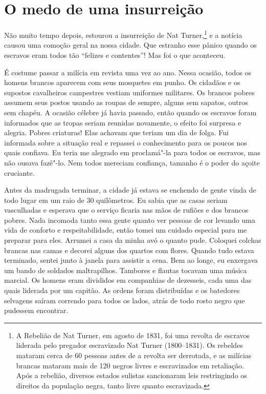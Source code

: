 \chapter*{O medo de uma insurreição}

Não muito tempo depois, estourou a
insurreição de Nat Turner,\footnote{A Rebelião de Nat Turner, em agosto
  de 1831, foi uma revolta de escravos liderada pelo pregador
  escravizado Nat Turner (1800--1831). Os rebeldes mataram cerca de 60
  pessoas antes de a revolta ser derrotada, e as milícias brancas
  mataram mais de 120 negros livres e escravizados em retaliação. Após a
  rebelião, diversos estados sulistas sancionaram leis restringindo os
  direitos da população negra, tanto livre quanto escravizada.} e a
notícia causou uma comoção geral na nossa cidade. Que estranho esse
pânico quando os escravos eram todos tão ``felizes e contentes''! Mas
foi o que aconteceu.

É costume passar a milícia em revista
uma vez ao ano. Nessa ocasião, todos os homens brancos aparecem com seus
mosquetes em punho. Os cidadãos e os supostos cavalheiros campestres
vestiam uniformes militares. Os brancos pobres assumem seus postos
usando as roupas de sempre, alguns sem sapatos, outros sem chapéu. A
ocasião célebre já havia passado, então quando os escravos foram
informados que as tropas seriam reunidas novamente, o efeito foi
surpresa e alegria. Pobres criaturas! Elas achavam que teriam um dia de
folga. Fui informada sobre a situação real e repassei o conhecimento
para os poucos nos quais confiava. Eu teria me alegrado em proclamá"-la
para todos os escravos, mas não ousava fazê"-lo. Nem todos mereciam
confiança, tamanho é o poder do açoite cruciante.

Antes da madrugada terminar, a cidade
já estava se enchendo de gente vinda de todo lugar em um raio de 30
quilômetros. Eu sabia que as casas seriam vasculhadas e esperava que o
serviço ficaria nas mãos de rufiões e dos brancos pobres. Nada incomoda
tanto essa gente quanto ver pessoas de cor levando uma vida de conforto
e respeitabilidade, então tomei um cuidado especial para me preparar
para eles. Arrumei a casa da minha avó o quanto pude. Coloquei colchas
brancas nas camas e decorei alguns dos quartos com flores. Quando tudo
estava terminado, sentei junto à janela para assistir a cena. Bem ao
longe, eu enxergava um bando de soldados maltrapilhos. Tambores e
flautas tocavam uma música marcial. Os homens eram divididos em
companhias de dezesseis, cada uma das quais liderada por um capitão. As
ordens foram distribuídas e os batedores selvagens saíram correndo para
todos os lados, atrás de todo rosto negro que pudessem encontrar.

